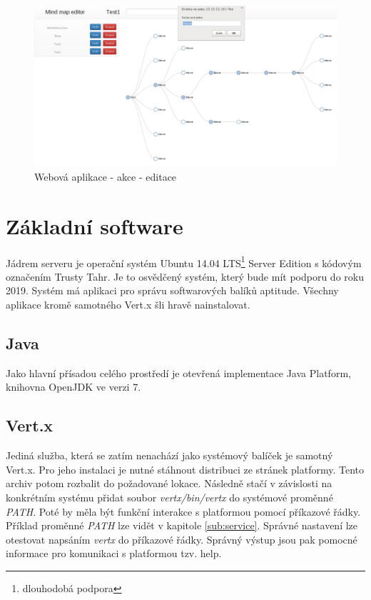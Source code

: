 \begin{figure}
\begin{centering}
\includegraphics[width	=1\textwidth]{obrazky/mindmap3}
\par\end{centering}
\caption{Webová aplikace - akce - editace\label{fig:midnmap3}}
\end{figure}

\section{Základní software}

Jádrem serveru je operační systém Ubuntu\cite{ubuntu} 14.04 LTS\footnote{dlouhodobá podpora} Server Edition s kódovým označením 
Trusty Tahr. Je to osvědčený systém, který bude mít podporu do roku 2019. Systém má aplikaci pro správu softwarových balíků 
aptitude. Všechny aplikace kromě samotného Vert.x šli hravě nainstalovat.

\subsection{Java}

Jako hlavní přísadou celého prostředí je otevřená implementace Java Platform, knihovna OpenJDK ve verzi 7.

\subsection{Vert.x}

Jediná služba, která se zatím nenachází jako systémový balíček je samotný Vert.x. Pro jeho instalaci je nutné stáhnout distribuci ze stránek platformy. Tento archiv potom rozbalit do požadované lokace. Následně stačí v závislosti na konkrétním systému přidat soubor \emph{vertx/bin/vertx} do systémové proměnné \emph{PATH}. Poté by měla být funkční interakce s platformou pomocí příkazové řádky. Příklad proměnné \emph{PATH} lze vidět v kapitole \ref{sub:service}. Správné nastavení lze otestovat napsáním \emph{vertx} do příkazové řádky. Správný výstup jsou pak pomocné informace pro komunikaci s platformou tzv. help.

